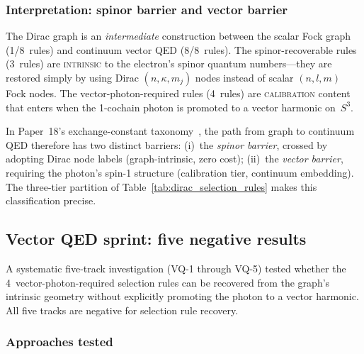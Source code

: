\documentclass[11pt]{article}
\begin{document}
\subsubsection{Interpretation: spinor barrier and vector barrier}

The Dirac graph is an \emph{intermediate} construction between the
scalar Fock graph (1/8~rules) and continuum vector QED (8/8~rules).
The spinor-recoverable rules (3~rules) are \textsc{intrinsic} to the
electron's spinor quantum numbers---they are restored simply by using
Dirac $(n, \kappa, m_j)$ nodes instead of scalar $(n, l, m)$ Fock
nodes.  The vector-photon-required rules (4~rules) are
\textsc{calibration} content that enters when the 1-cochain photon is
promoted to a vector harmonic on~$S^3$.

In Paper~18's exchange-constant taxonomy~\cite{paper18}, the path from
graph to continuum QED therefore has two distinct barriers:
(i)~the \emph{spinor barrier}, crossed by adopting Dirac node labels
(graph-intrinsic, zero cost); (ii)~the \emph{vector barrier}, requiring
the photon's spin-1 structure (calibration tier, continuum embedding).
The three-tier partition of Table~\ref{tab:dirac_selection_rules}
makes this classification precise.

\subsection{Vector QED sprint: five negative results}
\label{sec:vq_sprint}

A systematic five-track investigation (VQ-1 through VQ-5) tested whether
the 4~vector-photon-required selection rules can be recovered from the
graph's intrinsic geometry without explicitly promoting the photon to a
vector harmonic.  All five tracks are negative for selection rule
recovery.

\subsubsection{Approaches tested}
\end{document}
